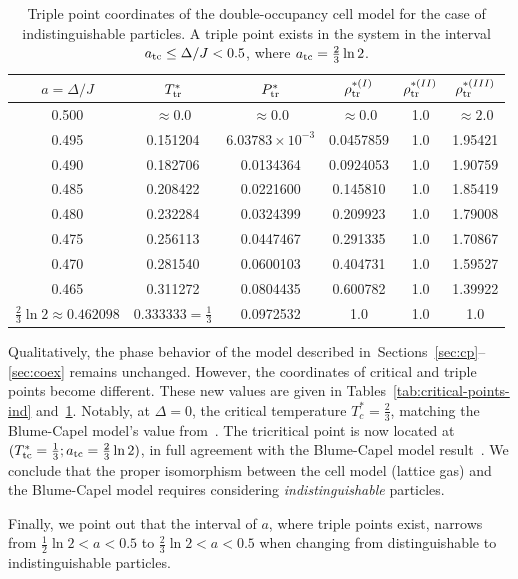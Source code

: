 \documentclass[pdflatex,sn-mathphys-num]{sn-jnl}%
\theoremstyle{thmstyleone}%
\theoremstyle{thmstyletwo}%
\theoremstyle{thmstylethree}%
\begin{document}
	\begin{table}[h]
	\centering
	\caption{Triple point coordinates of the double-occupancy cell model for the case of indistinguishable particles. A triple point exists in the system in the interval $a_{\rm tc} \leq \Delta/J < 0.5$, where $a_{\rm tc} = \frac{2}{3} \ln 2$.}
		\begin{tabular}{c|c|c|c|c|c}
			\toprule
			$a=\Delta/J$ & $T^*_{\rm tr}$ & $P^*_{\rm tr}$ & $\rho^{*(I)}_{\rm tr}$ & $\rho^{*(II)}_{\rm tr}$ & $\rho^{*(III)}_{\rm tr}$ \\
			\midrule
			0.500 & $\approx 0.0$ & $\approx 0.0$ & $\approx 0.0$ & 1.0 & $\approx 2.0$ \\
			0.495 & 0.151204 & $6.03783 \times 10^{-3}$ & 0.0457859 & 1.0 & 1.95421 \\
			0.490 & 0.182706 & 0.0134364 & 0.0924053 & 1.0 & 1.90759 \\
			0.485 & 0.208422 & 0.0221600 & 0.145810 & 1.0 & 1.85419 \\
			0.480 & 0.232284 & 0.0324399 & 0.209923 & 1.0 & 1.79008 \\
			0.475 & 0.256113 & 0.0447467 & 0.291335  & 1.0 & 1.70867 \\
			0.470 & 0.281540 & 0.0600103 & 0.404731 & 1.0 & 1.59527 \\
			0.465 & 0.311272 & 0.0804435 & 0.600782 & 1.0 & 1.39922 \\
			$\frac{2}{3}\ln 2 \approx 0.462098$ & $0.333333 = \frac{1}{3}$ & 0.0972532 & 1.0 & 1.0 & 1.0 \\
			\bottomrule
		\end{tabular}
		\label{tab:triple-line-ind}
	\end{table}
	
	Qualitatively, the phase behavior of the model described in~Sections~\ref{sec:cp}--\ref{sec:coex} remains unchanged. However, the coordinates of critical and triple points become different. These new values are given in Tables~\ref{tab:critical-points-ind} and~\ref{tab:triple-line-ind}.
	Notably, at $\Delta = 0$, the critical temperature $T^*_c = \frac{2}{3}$, matching the Blume-Capel model's value from~\cite{HKBHK25}. The tricritical point is now located at $(T^*_{\rm tc} = \frac{1}{3}; a_{\rm tc} = \frac{2}{3} \ln 2)$, in full agreement with the Blume-Capel model result~\cite{HKBHK25}. We conclude that the proper isomorphism between the cell model (lattice gas) and the Blume-Capel model requires considering \emph{indistinguishable} particles.
	
	Finally, we point out that the interval of $a$, where triple points exist, narrows from $\frac{1}{2} \ln 2 < a < 0.5$ to $\frac{2}{3}\ln 2 < a < 0.5$ when changing from distinguishable to indistinguishable particles.
	
\end{document}
